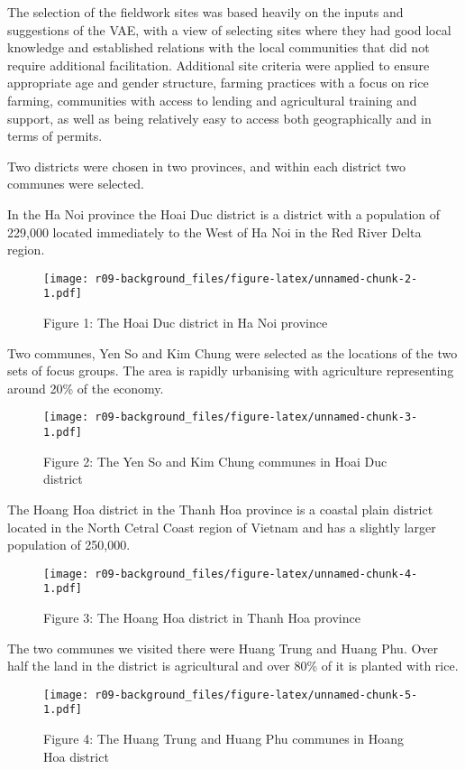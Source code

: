 \documentclass[]{article}
\begin{document}
The selection of the fieldwork sites was based heavily on the inputs and
suggestions of the VAE, with a view of selecting sites where they had
good local knowledge and established relations with the local
communities that did not require additional facilitation. Additional
site criteria were applied to ensure appropriate age and gender
structure, farming practices with a focus on rice farming, communities
with access to lending and agricultural training and support, as well as
being relatively easy to access both geographically and in terms of
permits.

Two districts were chosen in two provinces, and within each district two
communes were selected.

In the Ha Noi province the Hoai Duc district is a district with a
population of 229,000 located immediately to the West of Ha Noi in the
Red River Delta region.

\begin{figure}
\centering
\texttt{[image: r09-background\_files/figure-latex/unnamed-chunk-2-1.pdf]}
\caption{Figure 1: The Hoai Duc district in Ha Noi province}
\end{figure}

Two communes, Yen So and Kim Chung were selected as the locations of the
two sets of focus groups. The area is rapidly urbanising with
agriculture representing around 20\% of the economy.

\begin{figure}
\centering
\texttt{[image: r09-background\_files/figure-latex/unnamed-chunk-3-1.pdf]}
\caption{Figure 2: The Yen So and Kim Chung communes in Hoai Duc
district}
\end{figure}

The Hoang Hoa district in the Thanh Hoa province is a coastal plain
district located in the North Cetral Coast region of Vietnam and has a
slightly larger population of 250,000.

\begin{figure}
\centering
\texttt{[image: r09-background\_files/figure-latex/unnamed-chunk-4-1.pdf]}
\caption{Figure 3: The Hoang Hoa district in Thanh Hoa province}
\end{figure}

The two communes we visited there were Huang Trung and Huang Phu. Over
half the land in the district is agricultural and over 80\% of it is
planted with rice.

\begin{figure}
\centering
\texttt{[image: r09-background\_files/figure-latex/unnamed-chunk-5-1.pdf]}
\caption{Figure 4: The Huang Trung and Huang Phu communes in Hoang Hoa
district}
\end{figure}
\end{document}
